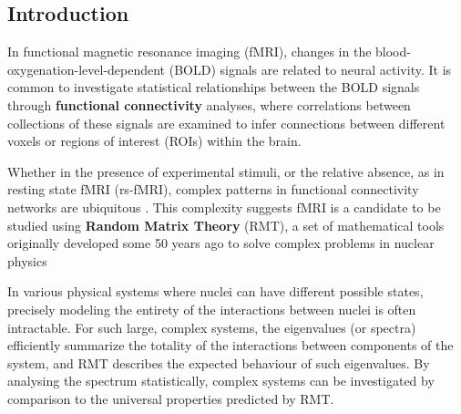 \documentclass[12pt]{spieman}  %
\begin{document}
\begin{spacing}{2}   %

\section{Introduction}
\label{sect:intro}  %

In functional magnetic resonance imaging (fMRI), changes in the blood-oxygenation-level-dependent
(BOLD) signals are related to neural activity. It is common to investigate statistical relationships
between the BOLD signals through \textbf{functional connectivity} analyses, where correlations between
collections of these signals are examined to infer connections between different voxels or regions
of interest (ROIs) within the brain.

Whether in the presence of experimental stimuli, or the relative absence, as in resting state fMRI (rs-fMRI),
complex patterns in functional connectivity networks are ubiquitous
\cite{bucknerBrainDefaultNetwork2008,foxCoverHumanBrain2005,gonzalez-castilloTaskbasedDynamicFunctional2018,hermundstadStructuralFoundationsRestingstate2013}.
This complexity suggests fMRI is a candidate to be studied using \textbf{Random Matrix Theory} (RMT), a set
of mathematical tools originally developed some 50 years ago to solve complex problems in nuclear
physics \cite{guhrRandommatrixTheoriesQuantum1998a,mehtaRandomMatrices2004}

In various
physical systems where nuclei can have different possible states, precisely modeling the entirety of
the interactions between nuclei is often intractable. For such large, complex systems, the
eigenvalues (or spectra) efficiently summarize the totality of the interactions between components
of the system, and RMT describes the expected behaviour of such eigenvalues. By analysing the
spectrum statistically, complex systems can be investigated by comparison to the universal
properties predicted by RMT.


\end{spacing}
\end{document}
